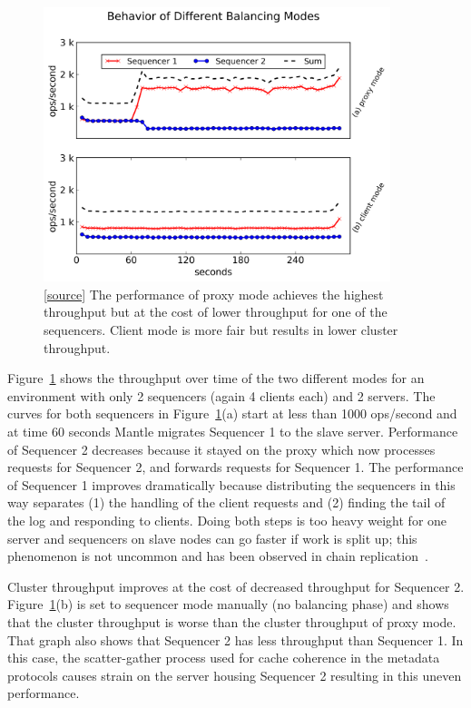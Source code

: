 \begin{figure}[tb]
\centering
\includegraphics[width=0.9\textwidth]{./chapters/controlplane/malacology/figures/mantle-mode-behavior.png}
\caption{
[\href{https://github.com/michaelsevilla/malacology-popper/blob/v2.1/experiments/mds-zlog-seq-migrate-redux-waves/results-paper/visualize.ipynb}{source}]
The performance of proxy mode achieves the highest throughput but at the cost
of lower throughput for one of the sequencers. Client mode is more fair but
results in lower cluster throughput.  }\label{fig:mantle-mode-behavior}
\end{figure}

Figure~\ref{fig:mantle-mode-behavior} shows the throughput over time of the two
different modes for an environment with only 2 sequencers (again 4 clients
each) and 2 servers. The curves for both sequencers in
Figure~\ref{fig:mantle-mode-behavior}(a) start at less than 1000 ops/second and
at time 60 seconds Mantle migrates Sequencer 1 to the slave server.
Performance of Sequencer 2 decreases because it stayed on the proxy which now
processes requests for Sequencer 2, and forwards requests for Sequencer 1. The
performance of Sequencer 1 improves dramatically because distributing the
sequencers in this way separates (1) the handling of the client requests and
(2) finding the tail of the log and responding to clients.  Doing both steps is
too heavy weight for one server and sequencers on slave nodes can go faster if
work is split up; this phenomenon is not uncommon and has been observed in
chain replication~\cite{chain_rep}.

Cluster throughput improves at the cost of decreased throughput for Sequencer
2.  Figure~\ref{fig:mantle-mode-behavior}(b) is set to sequencer mode manually
(no balancing phase) and shows that the cluster throughput is worse than the
cluster throughput of proxy mode. That graph also shows that Sequencer 2 has
less throughput than Sequencer 1. In this case, the scatter-gather process used
for cache coherence in the metadata protocols causes strain on the server
housing Sequencer 2 resulting in this uneven performance. 

